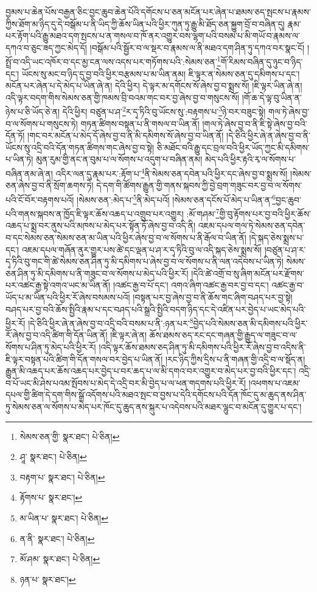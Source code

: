 བྱམས་པ་ཆེན་པོས་བརྒྱན་ཅིང་བྱང་ཆུབ་ཆེན་པོའི་དགོངས་པ་ཅན་མངོན་པར་ཞེན་པ་ཐམས་ཅད་སྤངས་པ་རྣམས་ཀྱིས་ཐོག་མ་ཉིད་དུ་དེ་བསྒོམ་པ་ནི་ཡིད་ཀྱི་ཆོས་ཡིན་པའི་ཕྱིར་ཀུན་ཏུ་རྒྱུ་མི་ཐོད་ཅན་སྐྱུག་བྲོ་བ་བཞིན་དུ། རྣམ་པར་རྟོག་པའི་རྒྱུ་མཐའ་དག་སྤངས་པ་ན་གསལ་བ་ཁོ་ནར་འགྱུར་བས་ལྷག་པའི་བསམ་པ་མི་གཡོ་བ་རྣམས་ལ་དཀའ་བ་ཅུང་ཟད་ཀྱང་མེད་དོ། །བསྒོམ་པའི་སྦྱོར་བ་ལ་སྡར་བ་རྣམས་ལ་ནི་མཐའ་དག་ཤིན་ཏུ་དཀའ་བར་སྣང་ངོ། །སྤྲོ་བ་འདི་ཡང་འཁོར་བ་དང་མྱ་ངན་ལས་འདས་པར་གཏོགས་པའི་:སེམས་ཅན་\footnote{སེམས་ཅན་གྱི་  སྣར་ཐང་།  པེ་ཅིན། }གོ་རིམས་བཞིན་དུ་ཉུང་བ་ཉིད་དང་། ཡོངས་སུ་མང་བ་ཉིད་དུ་བྱ་བའི་ཕྱིར་བརྩམས་པ་མ་ཡིན་ནམ། ཇི་ལྟར་ན་སེམས་ཅན་དུ་དམིགས་པ་དང་། མངོན་པར་ཞེན་པ་དེ་མེད་པ་ཡིན་ཞེ་ན། དེའི་ཕྱིར། དེ་ལྟར་མ་དགོངས་སོ་ཞེས་བྱ་བ་སྨྲས་སོ། །ཇི་ལྟར་ཡིན་ཞེ་ན། འདི་ལྟར་བདག་གིས་སེམས་ཅན་གྱི་ཁམས་བྲི་བའམ་གང་བར་བྱ་ཞེས་བྱ་བ་གསུངས་སོ། །གོ་ཆ་དེ་ལྟ་བུ་ཡིན་ན་ཉེས་པ་ཅི་ཡོད་ཅེ་ན། དེའི་ཕྱིར། བཙུན་པ་ཤ་\footnote{ཤཱ་  སྣར་ཐང་།  པེ་ཅིན། }ར་དྭ་ཏིའི་བུ་ཡོངས་སུ་:བརྟགས་པ་\footnote{བརྟག་པ་  སྣར་ཐང་།  པེ་ཅིན། }ཉེ་བར་བཟུང་སྟེ། གལ་ཏེ་ཞེས་བྱ་བ་ལ་སོགས་པ་གསུངས་ཏེ། གཏན་ཚིགས་བསྟན་པ་ནི་གསལ་བ་ཡིན་ནོ། །གལ་ཏེ་ཞེས་བྱ་བ་ནི་ཇི་སྟེ་ཞེས་བྱ་བའི་དོན་ཏོ། །གང་བར་མངོན་པ་མེད་དོ་ཞེས་བྱ་བ་ནི་མི་དམིགས་སོ་ཞེས་བྱ་བ་ཡིན་ནོ། །དེ་ཅིའི་ཕྱིར་ཞེ་ན་ཞེས་བྱ་བ་ནི་ཡོངས་སུ་འདྲི་བའི་དོན་གཏན་ཚིགས་གང་ཞེས་བྱ་བ་སྟེ། ཅི་མཐོང་བའི་རྒྱུ་དང་བྲལ་བའི་ཕྱིར་ཡོད་ཀྱང་མི་དམིགས་པ་ཡིན་ཏེ། མུན་རུམ་གྱི་ནང་ན་བུམ་པ་ལ་སོགས་པ་འདུག་པ་བཞིན་ནམ། མེད་པའི་ཕྱིར་རྟའི་རྭ་ལ་སོགས་པ་བཞིན་ནམ་ཞེ་ན། འདིར་ལན་དུ་རྣམ་པར་:རྟོག་པ་\footnote{རྟོགས་པ་  སྣར་ཐང་། }ནི་སེམས་ཅན་དབེན་པའི་ཕྱིར་དང་ཞེས་བྱ་བ་སྨྲས་སོ། །སེམས་ཅན་ཞེས་བྱ་བ་ནི་སྲོག་ཆགས་ཏེ། དེ་དག་གི་ཚོགས་རྒྱུན་གྱི་གནས་སྐབས་ཀྱི་བྱེ་བྲག་གཟུང་བར་བྱ་བ་ལ་སོགས་པའི་ངོ་བོར་བརྟགས་པའོ། །སེམས་ཅན་:མེད་པ་\footnote{མ་ཡིན་པ་  སྣར་ཐང་།  པེ་ཅིན། }ནི་མེད་པའོ། །སེམས་ཅན་དངོས་པོ་མེད་པ་ཡིན་ན་\footnote{ན་ནི་  སྣར་ཐང་།  པེ་ཅིན། }བྱང་ཆུབ་པའི་གནས་སྐབས་ན་ཁྱོད་ཇི་ལྟར་ཆོས་འཆད་པ་འགྲུབ་པར་འགྱུར། :མོ་གཤམ་\footnote{མོ་ཤམ་  སྣར་ཐང་།  པེ་ཅིན། }གྱི་བུ་རྟོགས་པར་བྱ་བའི་ཕྱིར་ཆོས་འཆད་པ་སྨྲ་བར་ནུས་པའི་མཁས་པ་མེད་པར་སྟོན་ཏོ་ཞེས་བྱ་བ་འདི་ནི། འཇམ་དཔལ་གལ་ཏེ་སེམས་ཅན་དབེན་བ་དང་སེམས་ཅན་སེམས་ཅན་མ་ཡིན་པའི་ཕྱིར་ཞེས་བྱ་བ་ལ་སོགས་པ་ནི་རྒོལ་བ་ཡིན་ནོ། །དེ་སྐད་ཅེས་སྨྲས་པ་དང་། འཇམ་དཔལ་གཞོན་ནུར་གྱུར་པས་ཚེ་དང་ལྡན་པ་ཤ་ར་དྭ་ཏིའི་བུ་ལ་འདི་སྐད་ཅེས་སྨྲས་སོ། །བཙུན་པ་ཤ་ར་དྭ་ཏིའི་བུ་གང་གི་ཚེ་སེམས་ཅན་ཤིན་ཏུ་མི་དམིགས་པ་ཞེས་བྱ་བ་ལ་སོགས་པ་ནི་ལན་འདེབས་པ་ཡིན་ཏེ། སེམས་ཅན་ཤིན་ཏུ་མི་དམིགས་པ་ནི་གཟུང་བ་ལ་སོགས་པ་མེད་པའི་ཕྱིར་རོ། །དེའི་ཚེ་འགྲོ་བ་སུ་ཞིག་མངོན་པར་རྫོགས་པར་འཚང་རྒྱ་སྟེ་འགའ་ཡང་མ་ཡིན་ནོ། །འཚང་རྒྱ་བ་པོ་དང་། འགའ་ཞིག་འཚང་རྒྱ་བར་བྱ་བ་དང་། འཚང་རྒྱ་བ་ཡོད་པ་མ་ཡིན་པའི་ཕྱིར་རོ་ཞེས་བསམས་པའོ། །བསྟན་པར་བྱ་ཞེས་བྱ་བ་ནི་ཆོས་གང་ཞིག་བཤད་པར་བྱ་སྟེ། བཤད་པར་བྱ་བའི་ཆོས་སྤྱིའི་རྣམ་པ་དང་བཤད་པའི་སྒྲའི་སྤྱིའི་བདག་ཉིད་དང་དེ་འཛིན་པར་བྱེད་པ་ཡང་མེད་པའི་ཕྱིར་རོ། །དེ་ཅིའི་ཕྱིར་ཞེ་ན་ཞེས་བྱ་བ་འདྲི་བའི་བསམ་པ་ནི་:ཉན་པར་\footnote{ཉན་པ་  སྣར་ཐང་། }བྱེད་པའི་སེམས་ཅན་མི་དམིགས་པའི་ཕྱིར་རོ་ཞེས་བྱ་བ་འདི་ཚིག་གི་དོན་ཡིན་ནོ། །ཇི་ལྟར་ཞེ་ན། ཆོས་ཐམས་ཅད་རང་དང་གཞན་གྱི་རྒྱུད་ལ་གཟུང་བ་ལ་སོགས་པ་ཤིན་ཏུ་མེད་པའི་ཕྱིར་རོ། །འདི་ལྟར་ཆོས་ཐམས་ཅད་ཤིན་ཏུ་མི་དམིགས་པའི་ཕྱིར་རོ་ཞེས་བྱ་བ་འདིས་ནི་ཇི་ལྟར་བསྟན་པའི་ཚིག་གི་དོན་གསལ་བར་བྱེད་པ་ཡིན་ནོ། །རང་ཉིད་ཀྱིས་དྲིས་པ་ནི་གཞན་གྱི་འདྲི་བ་ལ་སྡོད་ན། རྒྱུན་མི་འཆད་པར་ཆོས་འཆད་པར་བྱེད་པ་བར་ཆད་པ་ལ་མི་དགའ་བར་འགྱུར་བ་མེད་པར་བྱ་བའི་ཕྱིར་དང་། འདྲི་བ་པོ་ཡང་མི་ཤེས་པའམ་སྤོབས་པ་མེད་དེ་འདྲི་བར་མི་བྱེད་པ་ལ་ཕན་གདགས་པའི་ཕྱིར་རོ། །འཕགས་པ་འཇམ་དཔལ་གྱི་ཚིག་དེ་དག་གིས་སྒྲོ་འདོགས་པའི་མཐའ་སྤང་བ་བྱས་པ་དེའི་དགོངས་པའི་དོན་ཁོང་དུ་མ་ཆུད་ནས་ཤིན་ཏུ་སེམས་ཅན་ལ་སོགས་པ་མེད་པར་ཁོང་དུ་ཆུད་ནས་སྐུར་པ་འདེབས་པའི་མཐར་ལྷུང་བ་མངོན་དུ་གྱུར་པ་དང་། 